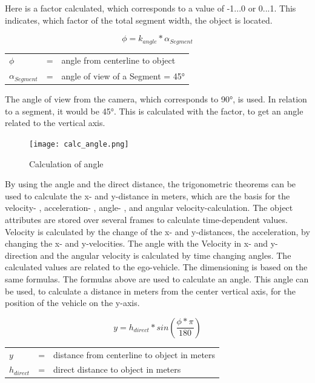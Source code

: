 Here is a factor calculated, which corresponds to a value of -1...0 or 0...1. This indicates, which factor of the total segment width, the object is located.

\begin{equation}
\phi = k_{angle} * \alpha_{Segment}
\end{equation}
\begin{table}[!h]
	\begin{center}
		\begin{tabular}{l c l}
			$\phi$ & = & angle from centerline to object\\
			$\alpha_{Segment}$ & = &  angle of view of a Segment = \ang{45}\\
		\end{tabular}
	\end{center}
\end{table}

The angle of view from the camera, which corresponds to \ang{90}, is used. In relation to a segment, it would be \ang{45}. This is calculated with the factor, to get an angle related to the vertical axis.

\begin{figure}[h]
	\centering
	\texttt{[image: calc\_angle.png]}
	\caption{Calculation of angle}
	\label{fig:anglecalculation}
\end{figure}

By using the angle and the direct distance, the trigonometric theorems can be used to calculate the x- and y-distance in meters, which are the basis for the velocity- , acceleration- , angle- , and angular velocity-calculation. The object attributes are stored over several frames to calculate time-dependent values. Velocity is calculated by the change of the x- and y-distances, the acceleration, by changing the x- and y-velocities. The angle with the Velocity in x- and y-direction and the angular velocity is calculated by time changing angles. The calculated values are related to the ego-vehicle.
The dimensioning is based on the same formulas. The formulas above are used to calculate an angle. This angle can be used, to calculate a distance in meters from the center vertical axis, for the position of the vehicle on the y-axis.

\begin{equation}
	y = h_{direct} * sin(\frac{\phi * \pi}{180})
\end{equation}
\begin{table}[!h]
	\begin{center}
		\begin{tabular}{l c l}
			$y$ & = & distance from centerline to object in meters\\
			$h_{direct}$ & = &  direct distance to object in meters\\
		\end{tabular}
	\end{center}
\end{table}

